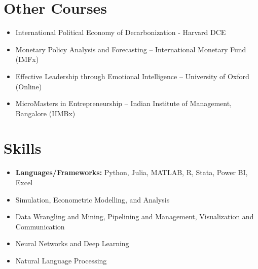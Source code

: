 \documentclass[11pt,a4paper,sans]{moderncv}
\newcommand*{\mycomment}[1]{}
\begin{document}
\section{Other Courses}
{\begin{itemize}[label=\textbullet]
    \item International Political Economy of Decarbonization - Harvard DCE
    \item Monetary Policy Analysis and Forecasting – International Monetary Fund (IMFx)
    \item Effective Leadership through Emotional Intelligence – University of Oxford (Online)
    \item MicroMasters in Entrepreneurship – Indian Institute of Management, Bangalore (IIMBx)
  \end{itemize}}

\section{Skills}
{\begin{itemize}[label=\textbullet]
\item {\textbf{Languages/Frameworks:} Python, Julia, MATLAB, R, Stata, Power BI, Excel}
\item Simulation, Econometric Modelling, and Analysis
\item Data Wrangling and Mining, Pipelining and Management, Visualization and Communication
\item Neural Networks and Deep Learning
\item Natural Language Processing
\end{itemize}}

\mycomment{
\section{Languages}
\begin{multicols}{2}
    \begin{itemize}[label=\textbullet]
    \item \textbf{English} [Native]
    \item {\textbf{French} [Basic] - Learning}
    \item {\textbf{Hindi} [Basic]}
    \end{itemize}
\end{multicols}}
\end{document}
